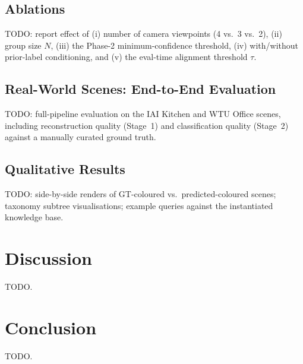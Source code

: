 \documentclass[conference]{IEEEtran}
\begin{document}
\subsection{Ablations}
\label{sec:ablations}
TODO: report effect of (i) number of camera viewpoints (4 vs.\ 3
vs.\ 2), (ii) group size $N$, (iii) the Phase-2 minimum-confidence
threshold, (iv) with/without prior-label conditioning, and (v) the
eval-time alignment threshold $\tau$.

\subsection{Real-World Scenes: End-to-End Evaluation}
\label{sec:eval_real}
TODO: full-pipeline evaluation on the IAI Kitchen and WTU Office
scenes, including reconstruction quality (Stage~1) and classification
quality (Stage~2) against a manually curated ground truth.

\subsection{Qualitative Results}
\label{sec:qualitative}
TODO: side-by-side renders of GT-coloured vs.\ predicted-coloured
scenes; taxonomy subtree visualisations; example queries against the
instantiated knowledge base.

\section{Discussion}
TODO.

\section{Conclusion}
TODO.



\end{document}
